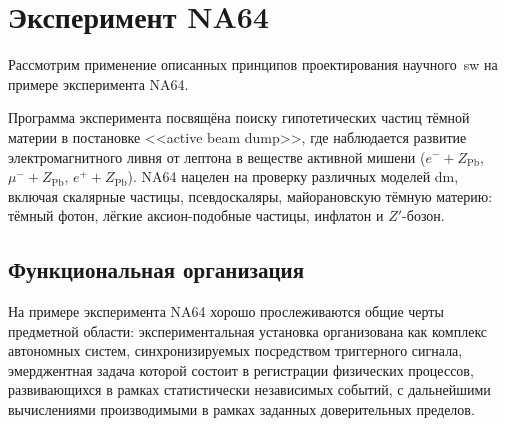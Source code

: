 \chapter{Эксперимент NA64}

Рассмотрим применение описанных принципов проектирования
научного~\acrshort{sw} на примере эксперимента NA64.

Программа эксперимента посвящёна поиску гипотетических частиц тёмной материи в
постановке <<active beam dump>>, где
наблюдается развитие электромагнитного ливня от лептона в веществе активной мишени
($e^{-} + Z_{\text{Pb}}$, $\mu^{-} + Z_{\text{Pb}}$, $e^{+} + Z_{\text{Pb}}$).
NA64 нацелен на проверку различных моделей \acrshort{dm}, включая скалярные
частицы, псевдоскаляры, майорановскую тёмную материю: тёмный фотон,
лёгкие аксион-подобные частицы, инфлатон и $Z'$-бозон.









\section{Функциональная организация}

На примере эксперимента NA64 хорошо прослеживаются общие черты
предметной области: экспериментальная установка организована
как комплекс автономных систем, синхронизируемых
посредством триггерного сигнала, эмерджентная задача которой состоит
в регистрации физических процессов, развивающихся в рамках
статистически независимых событий, с дальнейшими
вычислениями производимыми в рамках заданных доверительных
пределов.

